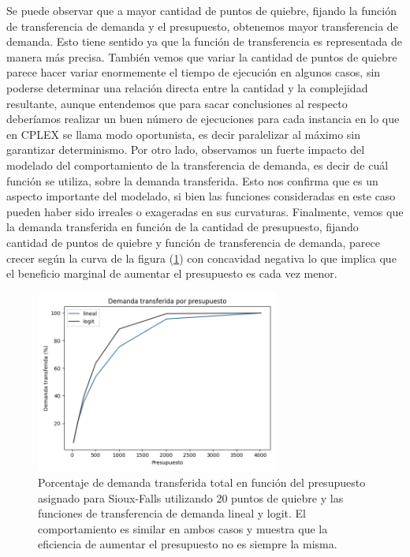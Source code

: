 \documentclass{article}
\begin{document}
  Se puede observar que a mayor cantidad de puntos de quiebre, fijando la función de transferencia de demanda y el presupuesto, obtenemos mayor transferencia de demanda. Esto tiene sentido ya que la función de transferencia es representada de manera más precisa. También vemos que variar la cantidad de puntos de quiebre parece hacer variar enormemente el tiempo de ejecución en algunos casos, sin poderse determinar una relación directa entre la cantidad y la complejidad resultante, aunque entendemos que para sacar conclusiones al respecto deberíamos realizar un buen número de ejecuciones para cada instancia en lo que en CPLEX se llama modo oportunista, es decir paralelizar al máximo sin garantizar determinismo. Por otro lado, observamos un fuerte impacto del modelado del comportamiento de la transferencia de demanda, es decir de cuál función se utiliza, sobre la demanda transferida. Esto nos confirma que es un aspecto importante del modelado, si bien las funciones consideradas en este caso pueden haber sido irreales o exageradas en sus curvaturas. Finalmente, vemos que la demanda transferida en función de la cantidad de presupuesto, fijando cantidad de puntos de quiebre y función de transferencia de demanda, parece crecer según la curva de la figura (\ref{fig:demandtransferbybudgetlinear}) con concavidad negativa lo que implica que el beneficio marginal de aumentar el presupuesto es cada vez menor.

  \begin{figure}[h!]
    \centering
    \includegraphics[width=8cm]{../resources/demand_by_budget.png}
      \caption{Porcentaje de demanda transferida total en función del presupuesto asignado para Sioux-Falls utilizando 20 puntos de quiebre y las funciones de transferencia de demanda lineal y logit. El comportamiento es similar en ambos casos y muestra que la eficiencia de aumentar el presupuesto no es siempre la misma.}
    \label{fig:demandtransferbybudgetlinear}
  \end{figure}
\end{document}
